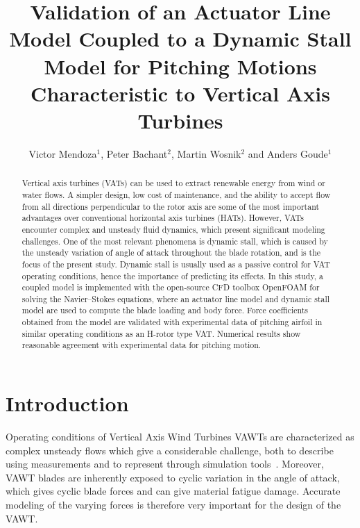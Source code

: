 \documentclass[a4paper]{jpconf}
\begin{document}
\title{Validation of an Actuator Line Model Coupled to a Dynamic Stall Model for
Pitching Motions Characteristic to Vertical Axis Turbines}


\author{Victor Mendoza$^{1}$, Peter Bachant$^{2}$, Martin Wosnik$^{2}$ and Anders Goude$^{1}$ }
\address{$^{1}$ Department of Engineering Sciences, Division of Electricity, Uppsala University, \\Uppsala 751 21, Sweden}
\address{$^{2}$ Center for Ocean Renewable Energy, University of New Hampshire, 24 Colovos Rd.,\\ Durham, NH 03824, USA}

\begin{abstract}
    Vertical axis turbines (VATs) can be used to extract renewable energy from
    wind or water flows. A simpler design, low cost of maintenance, and the
    ability to accept flow from all directions perpendicular to the rotor axis
    are some of the most important advantages over conventional horizontal axis
    turbines (HATs). However, VATs encounter complex and unsteady fluid
    dynamics, which present significant modeling challenges. One of the most
    relevant phenomena is dynamic stall, which is caused by the unsteady
    variation of angle of attack throughout the blade rotation, and is the focus
    of the present study. Dynamic stall is usually used as a passive control for
    VAT operating conditions, hence the importance of predicting its effects. In
    this study, a coupled model is implemented with the open-source CFD
    toolbox OpenFOAM for solving the Navier--Stokes equations, where an actuator
    line model and dynamic stall model are used to compute the blade loading and
    body force. Force coefficients obtained from the model are validated with
    experimental data of pitching airfoil in similar operating conditions as an
    H-rotor type VAT. Numerical results show reasonable agreement with
    experimental data for pitching motion.
\end{abstract}

\section{Introduction}

Operating conditions of Vertical Axis Wind Turbines VAWTs are characterized as
complex unsteady flows which give a considerable challenge, both to describe
using measurements and to represent through simulation
tools~\cite{huyer1996unsteady}. Moreover, VAWT blades are inherently exposed to
cyclic variation in the angle of attack, which gives cyclic blade forces and can
give material fatigue damage. Accurate modeling of the varying forces is
therefore very important for the design of the VAWT.
\end{document}
